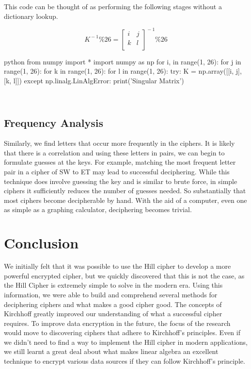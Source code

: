 \documentclass{article}
\begin{document}
\begin{center}
 This code can be thought of as performing the following stages without a dictionary lookup. 
\end{center}

  \[K^{\!-1} \% 26=
  \begin{bmatrix}
 i& j\\
    k& l\\
  \end{bmatrix}^{\!-1}\%26\]
 
\begin{mintedbox}{python}
from numpy import *
import numpy as np
for i, in range(1, 26):
    for j in range(1, 26):
        for k in range(1, 26):
            for l in range(1, 26):
                try:
                    K = np.array([[i, j],
                                [k, l]])
                except np.linalg.LinAlgError:
                    print('Singular Matrix')

\end{mintedbox}
\\

\subsection*{Frequency Analysis
}
Similarly, we find letters that occur more frequently in the ciphers. It is likely that there is a correlation and using these letters in pairs, we can begin to formulate guesses at the keys. For example, matching the most frequent letter pair in a cipher of SW to ET may lead to successful deciphering. While this technique does involve guessing the key and is similar to brute force, in simple ciphers it sufficiently reduces the number of guesses needed. So substantially that most ciphers become decipherable by hand. With the aid of a computer, even one as simple as a graphing calculator, deciphering becomes trivial.

  
\section*{Conclusion}
We initially felt that it was possible to use the Hill cipher to develop a more powerful encrypted cipher, but we quickly discovered that this is not the case, as the Hill Cipher is extremely simple to solve in the modern era. Using this information, we were able to build and comprehend several methods for deciphering ciphers and what makes a good cipher good. The concepts of Kirchhoff greatly improved our understanding of what a successful cipher requires. To improve data encryption in the future, the focus of the research would move to discovering ciphers that adhere to Kirchhoff's principles. Even if we didn't need to find a way to implement the Hill cipher in modern applications, we still learnt a great deal about what makes linear algebra an excellent technique to encrypt various data sources if they can follow Kirchhoff's principle.

  
\end{document}

